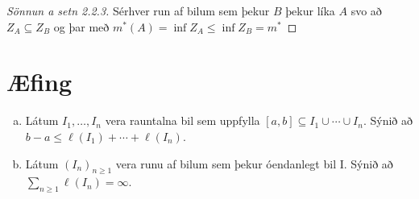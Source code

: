 \documentclass[12pt]{book} \usepackage[utf8]{inputenc}
\begin{document}
\begin{proof}[Sönnun a setn 2.2.3] Sérhver run af bilum sem þekur $B$
  þekur líka $A$ svo að $Z_A \subseteq Z_B$ og þar með
  $m^{*}(A) = \inf{Z_A} \leq \inf{Z_B} = m^{*}$
\end{proof}

\section*{Æfing}
\begin{enumerate}[(a)]
\item Látum $I_1, \dotsc, I_n$ vera rauntalna bil sem uppfylla
  $[a,b] \subseteq I_1 \cup \dotsb \cup I_n$. Sýnið að
  $b - a \leq \ell(I_1) + \dotsb + \ell(I_n)$.
\item Látum $(I_n)_{n \geq 1}$ vera runu af bilum sem þekur óendanlegt
  bil I. Sýnið að $\sum_{n \geq 1} \ell(I_n) = \infty$.
\end{enumerate}
\end{document}
